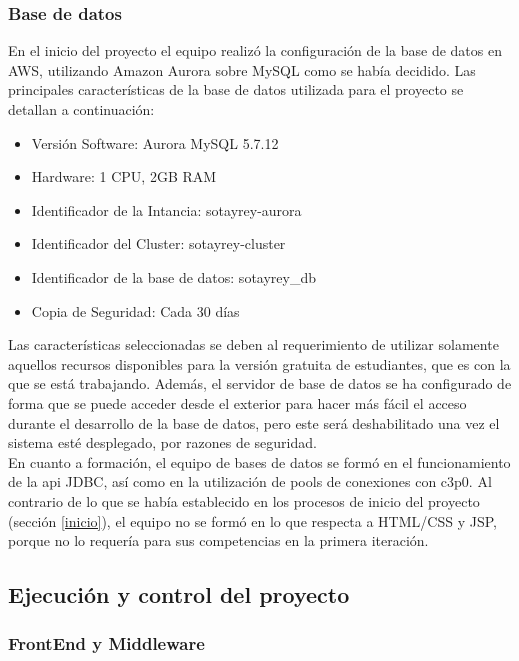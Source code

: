 \subsubsection*{Base de datos}
En el inicio del proyecto el equipo realizó la configuración de la base de datos en AWS, utilizando Amazon Aurora sobre MySQL como se había decidido. Las principales características de la base de datos utilizada para el proyecto se detallan a continuación:

\begin{itemize}
	\item Versión Software: Aurora MySQL 5.7.12
	\item Hardware: 1 CPU, 2GB RAM
	\item Identificador de la Intancia: sotayrey-aurora
	\item Identificador del Cluster: sotayrey-cluster
	\item Identificador de la base de datos: sotayrey\_db
	\item Copia de Seguridad: Cada 30 días
\end{itemize}

Las características seleccionadas se deben al requerimiento de utilizar solamente aquellos recursos disponibles para la versión gratuita de estudiantes, que es con la que se está trabajando. Además, el servidor de base de datos se ha configurado de forma que se puede acceder desde el exterior para hacer más fácil el acceso durante el desarrollo de la base de datos, pero este será deshabilitado una vez el sistema esté desplegado, por razones de seguridad.\\

En cuanto a formación, el equipo de bases de datos se formó en el funcionamiento de la api JDBC, así como en la utilización de pools de conexiones con c3p0. Al contrario de lo que se había establecido en los procesos de inicio del proyecto (sección \ref{inicio}), el equipo no se formó en lo que respecta a HTML/CSS y JSP, porque no lo requería para sus competencias en la primera iteración.
\subsection{Ejecución y control del proyecto}
\label{Ejecucion y control del proyecto}
\subsubsection*{FrontEnd y Middleware}




